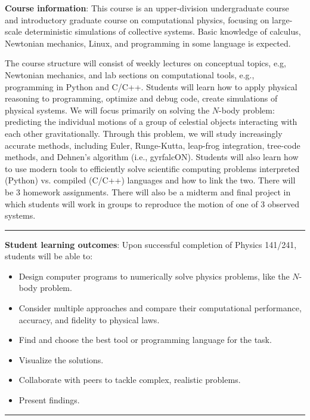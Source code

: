 \documentclass[12pt]{article}
\begin{document}
\noindent\textbf{Course information}: This course is an upper-division undergraduate course and introductory graduate course on computational physics, focusing on large-scale deterministic simulations of collective systems.
Basic knowledge of calculus, Newtonian mechanics, Linux, and programming in some language is expected.

The course structure will consist of weekly lectures on conceptual topics, e.g, Newtonian mechanics, and lab sections on computational tools, e.g., programming in Python and C/C++.
Students will learn how to apply physical reasoning to programming, optimize and debug code, create simulations of physical systems.
We will focus primarily on solving the $N$-body problem: predicting the individual motions of a group of celestial objects interacting with each other gravitationally.
Through this problem, we will study increasingly accurate methods, including Euler, Runge-Kutta, leap-frog integration, tree-code methods, and Dehnen's algorithm (i.e., gyrfalcON).
Students will also learn how to use modern tools to efficiently solve scientific computing problems interpreted (Python) vs. compiled (C/C++) languages and how to link the two.
There will be 3 homework assignments.
There will also be a midterm and final project in which students will work in groups to reproduce the motion of one of 3 observed systems.


\begin{center}
  \rule{\textwidth}{0.5pt}
\end{center}

\noindent\textbf{Student learning outcomes}: Upon successful completion of Physics 141/241, students will be able to:
\begin{itemize}
  \item Design computer programs to numerically solve physics problems, like the $N$-body problem.
  \item Consider multiple approaches and compare their computational performance, accuracy, and fidelity to physical laws.
  \item Find and choose the best tool or programming language for the task.
  \item Visualize the solutions.
  \item Collaborate with peers to tackle complex, realistic problems.
  \item Present findings.
\end{itemize}

\begin{center}
  \rule{\textwidth}{0.5pt}
\end{center}
\end{document}
